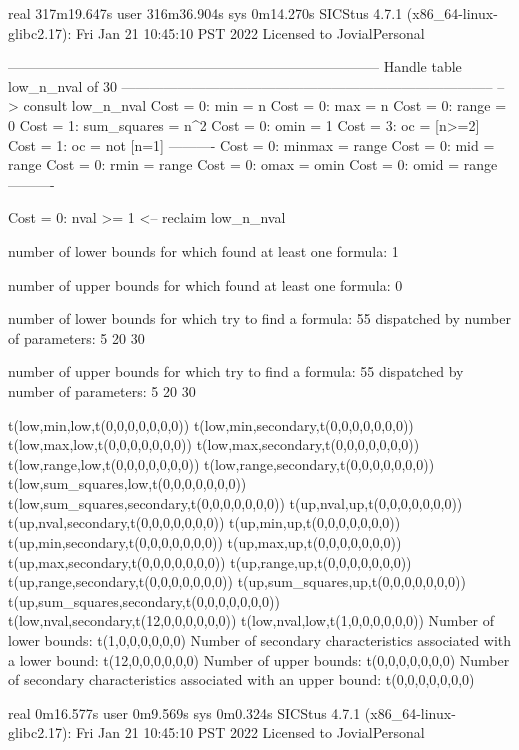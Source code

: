 real	317m19.647s
user	316m36.904s
sys	0m14.270s
SICStus 4.7.1 (x86_64-linux-glibc2.17): Fri Jan 21 10:45:10 PST 2022
Licensed to JovialPersonal


--------------------------------------------------------------------------------
Handle table low_n_nval of 30
--------------------------------------------------------------------------------
--> consult low_n_nval
Cost =  0:  min         = n
Cost =  0:  max         = n
Cost =  0:  range       = 0
Cost =  1:  sum_squares = n^2
Cost =  0:  omin        = 1
Cost =  3:  oc          = [n>=2]
Cost =  1:  oc          = not [n=1]
----------
Cost =  0:  minmax      = range
Cost =  0:  mid         = range
Cost =  0:  rmin        = range
Cost =  0:  omax        = omin
Cost =  0:  omid        = range
----------

Cost =  0:  nval >= 1
<-- reclaim low_n_nval

number of lower bounds for which found at least one formula: 1

number of upper bounds for which found at least one formula: 0

number of lower bounds for which try to find a formula: 55
dispatched by number of parameters: 5  20  30

number of upper bounds for which try to find a formula: 55
dispatched by number of parameters: 5  20  30

t(low,min,low,t(0,0,0,0,0,0,0))
t(low,min,secondary,t(0,0,0,0,0,0,0))
t(low,max,low,t(0,0,0,0,0,0,0))
t(low,max,secondary,t(0,0,0,0,0,0,0))
t(low,range,low,t(0,0,0,0,0,0,0))
t(low,range,secondary,t(0,0,0,0,0,0,0))
t(low,sum_squares,low,t(0,0,0,0,0,0,0))
t(low,sum_squares,secondary,t(0,0,0,0,0,0,0))
t(up,nval,up,t(0,0,0,0,0,0,0))
t(up,nval,secondary,t(0,0,0,0,0,0,0))
t(up,min,up,t(0,0,0,0,0,0,0))
t(up,min,secondary,t(0,0,0,0,0,0,0))
t(up,max,up,t(0,0,0,0,0,0,0))
t(up,max,secondary,t(0,0,0,0,0,0,0))
t(up,range,up,t(0,0,0,0,0,0,0))
t(up,range,secondary,t(0,0,0,0,0,0,0))
t(up,sum_squares,up,t(0,0,0,0,0,0,0))
t(up,sum_squares,secondary,t(0,0,0,0,0,0,0))
t(low,nval,secondary,t(12,0,0,0,0,0,0))
t(low,nval,low,t(1,0,0,0,0,0,0))
Number of lower bounds:                                             t(1,0,0,0,0,0,0)
Number of secondary characteristics associated with a lower bound:  t(12,0,0,0,0,0,0)
Number of upper bounds:                                             t(0,0,0,0,0,0,0)
Number of secondary characteristics associated with an upper bound: t(0,0,0,0,0,0,0)

real	0m16.577s
user	0m9.569s
sys	0m0.324s
SICStus 4.7.1 (x86_64-linux-glibc2.17): Fri Jan 21 10:45:10 PST 2022
Licensed to JovialPersonal


